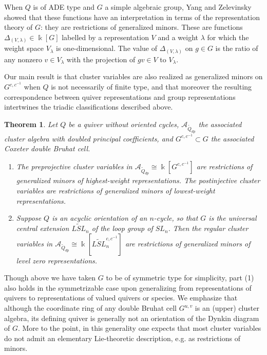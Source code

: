 \documentclass[12pt]{amsart}
\newcommand{\cA}{\mathcal{A}}
\newcommand{\kk}{\Bbbk}
\newcommand{\Qdp}{\widetilde{Q}_{dp}}
\newtheorem{theorem}{Theorem}[section]
\theoremstyle{remark}
\numberwithin{equation}{section}
\numberwithin{figure}{section}
\begin{document}
When $Q$ is of ADE type and $G$ a simple algebraic group, Yang and Zelevinsky \cite{YZ08} showed that these functions have an interpretation in terms of the representation theory of $G$: they are restrictions of generalized minors.
These are functions $\Delta_{(V,\lambda)} \in \kk[G]$ labelled by a representation $V$ and a weight $\lambda$ for which the weight space $V_\lambda$ is one-dimensional.  The value of $\Delta_{(V,\lambda)}$ on $g \in G$ is the ratio of any nonzero $v \in V_\lambda$ with the projection of $gv \in V$ to $V_\lambda$.

Our main result is that cluster variables are also realized as generalized minors on $G^{c,c^{-1}}$ when $Q$ is not necessarily of finite type, and that moreover the resulting correspondence between quiver representations and group representations intertwines the triadic classifications described above.

\begin{theorem}
  \label{thm:maintheorem}
  Let $Q$ be a quiver without oriented cycles, $\cA_{\Qdp}$ the associated cluster algebra with doubled principal coefficients, and $G^{c,c^{-1}} \subset G$ the associated Coxeter double Bruhat cell.
  \begin{enumerate}
    \item
      The preprojective cluster variables in $\cA_{\Qdp} \cong \kk[G^{c,c^{-1}}]$ are restrictions of generalized minors of highest-weight representations.
      The postinjective cluster variables are restrictions of generalized minors of lowest-weight representations.
    \item
      Suppose $Q$ is an acyclic orientation of an $n$-cycle, so that $G$ is the universal central extension $\widetilde{LSL}_n$ of the loop group of $SL_n$.
      Then the regular cluster variables in $\cA_{\Qdp}\cong \kk[\widetilde{LSL}_n^{c,c^{-1}}]$ are restrictions of generalized minors of level zero representations.
  \end{enumerate}
\end{theorem}

Though above we have taken $G$ to be of symmetric type for simplicity, part (1) also holds in the symmetrizable case upon generalizing from representations of quivers to representations of valued quivers or species.
We emphasize that although the coordinate ring of any double Bruhat cell $G^{u,v}$ is an (upper) cluster algebra, its defining quiver is generally not an orientation of the Dynkin diagram of $G$.
More to the point, in this generality one expects that most cluster variables do not admit an elementary Lie-theoretic description, e.g. as restrictions of minors.
\end{document}
